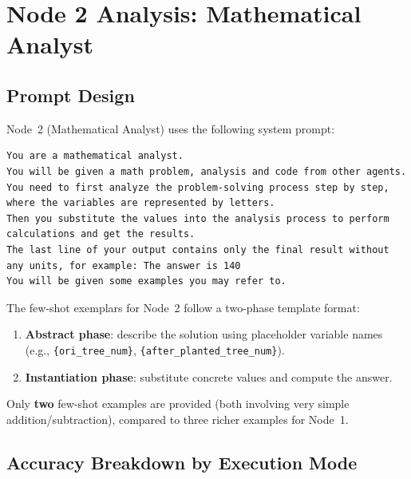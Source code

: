 \documentclass[11pt]{article}
\begin{document}
\section{Node 2 Analysis: Mathematical Analyst}
\label{sec:node2}

\subsection{Prompt Design}

Node~2 (Mathematical Analyst) uses the following system prompt:

\begin{lstlisting}
You are a mathematical analyst.
You will be given a math problem, analysis and code from other agents.
You need to first analyze the problem-solving process step by step,
where the variables are represented by letters.
Then you substitute the values into the analysis process to perform
calculations and get the results.
The last line of your output contains only the final result without
any units, for example: The answer is 140
You will be given some examples you may refer to.
\end{lstlisting}

\noindent The few-shot exemplars for Node~2 follow a two-phase template format:

\begin{enumerate}
  \item \textbf{Abstract phase}: describe the solution using placeholder variable
        names (e.g., \texttt{\{ori\_tree\_num\}}, \texttt{\{after\_planted\_tree\_num\}}).
  \item \textbf{Instantiation phase}: substitute concrete values and compute the
        answer.
\end{enumerate}

Only \textbf{two} few-shot examples are provided (both involving very simple
addition/subtraction), compared to three richer examples for Node~1.

\subsection{Accuracy Breakdown by Execution Mode}
\end{document}
